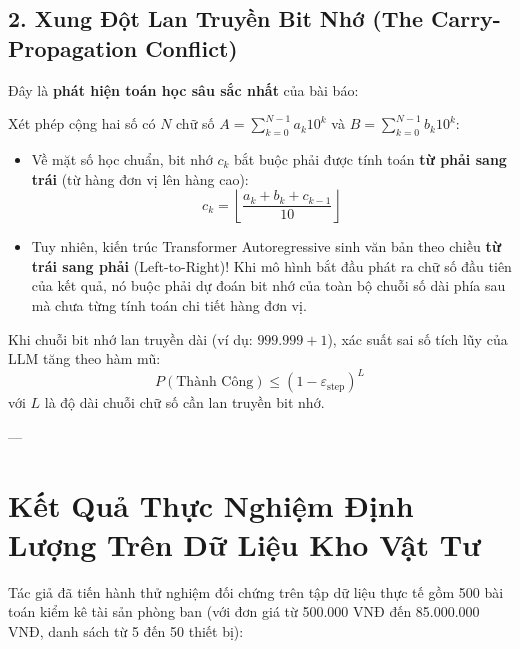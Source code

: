 \documentclass[11pt,a4paper]{article}
\begin{document}
\subsection{2. Xung Đột Lan Truyền Bit Nhớ (The Carry-Propagation Conflict)}
Đây là \textbf{phát hiện toán học sâu sắc nhất} của bài báo:
\begin{formulationbox}
Xét phép cộng hai số có $N$ chữ số $A = \sum_{k=0}^{N-1} a_k 10^k$ và $B = \sum_{k=0}^{N-1} b_k 10^k$:
\begin{itemize}[leftmargin=1.5em]
    \item Về mặt số học chuẩn, bit nhớ $c_k$ bắt buộc phải được tính toán \textbf{từ phải sang trái} (từ hàng đơn vị lên hàng cao):
    \begin{equation}
        c_k = \left\lfloor \frac{a_k + b_k + c_{k-1}}{10} \right\rfloor
    \end{equation}
    \item Tuy nhiên, kiến trúc Transformer Autoregressive sinh văn bản theo chiều \textbf{từ trái sang phải} (Left-to-Right)! Khi mô hình bắt đầu phát ra chữ số đầu tiên của kết quả, nó buộc phải dự đoán bit nhớ của toàn bộ chuỗi số dài phía sau mà chưa từng tính toán chi tiết hàng đơn vị.
\end{itemize}
Khi chuỗi bit nhớ lan truyền dài (ví dụ: $999.999 + 1$), xác suất sai số tích lũy của LLM tăng theo hàm mũ:
\begin{equation}
    P(\text{Thành Công}) \le (1 - \varepsilon_{\text{step}})^L
\end{equation}
với $L$ là độ dài chuỗi chữ số cần lan truyền bit nhớ.
\end{formulationbox}

---

\section{Kết Quả Thực Nghiệm Định Lượng Trên Dữ Liệu Kho Vật Tư}

Tác giả đã tiến hành thử nghiệm đối chứng trên tập dữ liệu thực tế gồm 500 bài toán kiểm kê tài sản phòng ban (với đơn giá từ 500.000 VNĐ đến 85.000.000 VNĐ, danh sách từ 5 đến 50 thiết bị):
\end{document}
